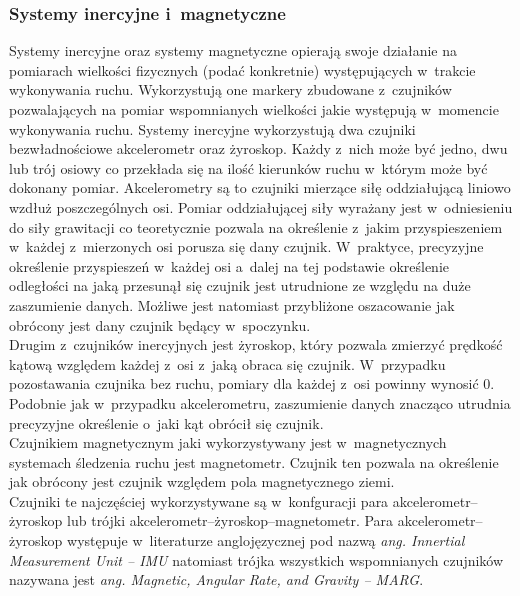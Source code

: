 \subsubsection*{Systemy inercyjne i~magnetyczne}\label{chap:mocaps:IMU}
Systemy inercyjne oraz systemy magnetyczne opierają swoje działanie na pomiarach wielkości fizycznych (podać konkretnie) występujących w~trakcie wykonywania ruchu. Wykorzystują one markery zbudowane z~czujników pozwalających na pomiar wspomnianych wielkości jakie występują w~momencie wykonywania ruchu. Systemy inercyjne wykorzystują dwa czujniki bezwładnościowe akcelerometr oraz żyroskop. Każdy z~nich może być jedno, dwu lub trój osiowy co przekłada się na ilość kierunków ruchu w~którym może być dokonany pomiar. Akcelerometry są to czujniki mierzące siłę oddziałującą liniowo wzdłuż poszczególnych osi. Pomiar oddziałującej siły wyrażany jest w~odniesieniu do siły grawitacji co teoretycznie pozwala na określenie z~jakim przyspieszeniem w~każdej z~mierzonych osi porusza się dany czujnik. W~praktyce, precyzyjne określenie przyspieszeń w~każdej osi a~dalej na tej podstawie określenie odległości na jaką przesunął się czujnik jest utrudnione ze względu na duże zaszumienie danych. Możliwe jest natomiast przybliżone oszacowanie jak obrócony jest dany czujnik będący w~spoczynku.\\
Drugim z~czujników inercyjnych jest żyroskop, który pozwala zmierzyć prędkość kątową względem każdej z~osi z~jaką obraca się czujnik. W~przypadku pozostawania czujnika bez ruchu, pomiary dla każdej z~osi powinny wynosić 0. Podobnie jak w~przypadku akcelerometru, zaszumienie danych znacząco utrudnia precyzyjne określenie o~jaki kąt obrócił się czujnik.\\
Czujnikiem magnetycznym jaki wykorzystywany jest w~magnetycznych systemach śledzenia ruchu jest magnetometr. Czujnik ten pozwala na określenie jak obrócony jest czujnik względem pola magnetycznego ziemi.\\
Czujniki te najczęściej wykorzystywane są w~konfguracji para akcelerometr--żyroskop lub trójki akcelerometr--żyroskop--magnetometr. Para akcelerometr--żyroskop występuje w~literaturze anglojęzycznej pod nazwą \emph{ang. Innertial Measurement Unit -- IMU} natomiast trójka wszystkich wspomnianych czujników nazywana jest \emph{ang. Magnetic, Angular Rate, and Gravity -- MARG}.\\
